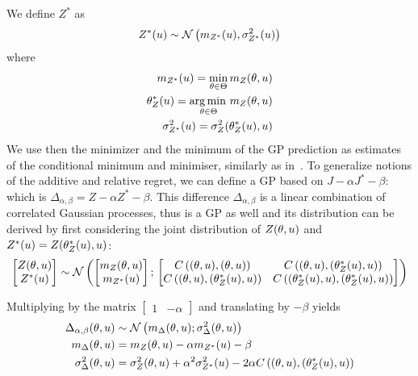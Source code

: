 \documentclass[../../Main_ManuscritThese.tex]{subfiles}
\begin{document}
We define $Z^*$ as
\begin{equation}
  Z^*(u) \sim \mathcal{N}\left(m_{Z^*}(u), \sigma^{2}_{Z^*}(u)\right)
\end{equation}
where
\begin{align}
  m_{Z^*}(u) = \min_{\theta\in\Theta} m_Z(\theta,u) \label{eq:def_mstar}\\
  \theta_Z^*(u)=\operatorname*{arg\,min \,}_{\theta\in\Theta} m_Z(\theta, u) \label{eq:theta_star}\\
  \sigma^{2}_{Z^*}(u) = \sigma^{2}_Z(\theta^*_Z(u), u) \label{eq:sigma_star} 
\end{align}
We use then the minimizer and the minimum of the GP prediction as estimates of the conditional minimum and minimiser, similarly as in~\cite{ginsbourger_bayesian_2014}. %
To generalize notions of the additive and relative regret, we can define a GP based on $J - \alpha J^* - \beta$: which is $\Delta_{\alpha, \beta} = Z - \alpha Z^* - \beta$.
This difference $\Delta_{\alpha,\beta}$ is a linear combination of correlated Gaussian processes, thus is a GP as well and its distribution can be derived by first considering the joint distribution of $Z(\theta,u)$ and $Z^*(u) = Z(\theta_Z^*(u), u)$:
\begin{equation}
  \begin{bmatrix}
    Z(\theta,u) \\
    Z^*(u)
  \end{bmatrix}
  \sim \mathcal{N}\left(
    \begin{bmatrix}
      m_Z(\theta,u) \\
      m_{{Z^*}}(u)
    \end{bmatrix}
    ;\,
    \begin{bmatrix}
      C\left((\theta,u),(\theta,u)\right) & C\left((\theta,u),(\theta^*_Z(u),u)\right) \\
      C\left((\theta,u),(\theta_Z^*(u),u)\right) & C\left((\theta^*_Z(u),u),(\theta_Z^*(u),u)\right)
    \end{bmatrix}
\right)
\end{equation}

Multiplying by the matrix $\begin{bmatrix}1 & -\alpha \end{bmatrix}$ and translating by $-\beta$ yields
\begin{align}
  \Delta_{\alpha,\beta}(\theta,u) &\sim \mathcal{N}\left(m_{\Delta}(\theta,u); \sigma^2_{\Delta}(\theta,u)\right)  \label{eq:delta_GP_ab}\\
  m_{\Delta}(\theta,u) &= m_Z(\theta,u) - \alpha m_{{Z^*}}(u) - \beta \label{eq:mu_delta_GP_ab}\\
  \sigma^2_{\Delta}(\theta,u) &= \sigma_Z^2(\theta,u) + \alpha^2 \sigma_{Z^*}^2(u) - 2\alpha C\left((\theta,u),(\theta^*_Z(u),u)\right) \label{eq:variance_delta_GP_ab}
\end{align}
\end{document}
